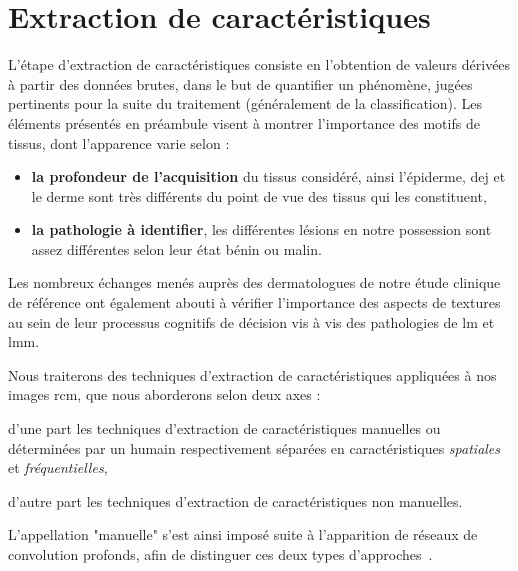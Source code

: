 \newpage

\section{Extraction de caractéristiques}
\label{chap:feature_extraction}
L'étape d'extraction de caractéristiques consiste en l'obtention de valeurs dérivées à partir des données brutes, dans le but de quantifier un phénomène, jugées pertinents pour la suite du traitement (généralement de la classification). Les éléments présentés en préambule visent à montrer l'importance des motifs de tissus, dont l'apparence varie selon :
\begin{itemize}
    \item \textbf{la profondeur de l'acquisition} du tissus considéré, ainsi l'épiderme, \gls{dej} et le derme sont très différents du point de vue des tissus qui les constituent,
    \item \textbf{la pathologie à identifier}, les différentes lésions en notre possession sont assez différentes selon leur état bénin ou malin.
\end{itemize}
Les nombreux échanges menés auprès des dermatologues de notre étude clinique de référence ont également abouti à vérifier l'importance des aspects de textures au sein de leur processus cognitifs de décision vis à vis des pathologies de \gls{lm} et \gls{lmm}.\par

Nous traiterons des techniques d'extraction de caractéristiques appliquées à nos images \gls{rcm}, que nous aborderons selon deux axes :
\begin{inlinerate}
    \item d'une part les techniques d'extraction de caractéristiques manuelles ou déterminées par un humain respectivement séparées en caractéristiques \textit{spatiales} et \textit{fréquentielles},
    \item d'autre part les techniques d'extraction de caractéristiques non manuelles.
\end{inlinerate} 
L'appellation "manuelle" s'est ainsi imposé suite à l'apparition de réseaux de convolution profonds, afin de distinguer ces deux types d'approches~\cite{Nanni2017}.\par

